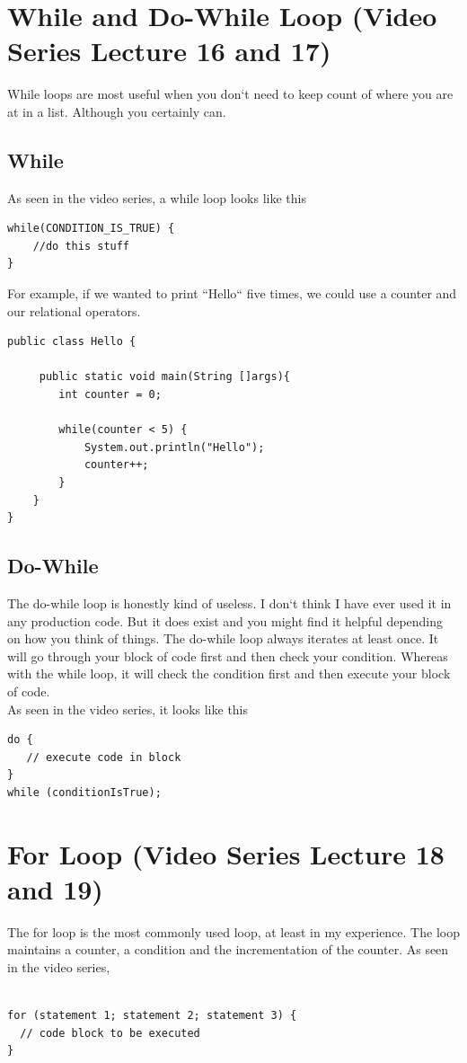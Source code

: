 \documentclass[11]{article}
\begin{document}
\section{While and Do-While Loop (Video Series Lecture 16 and 17)}
While loops are most useful when you don`t need to keep count of where you are at in a list. Although you certainly can.
\subsection{While}
As seen in the video series, a while loop looks like this
\begin{lstlisting}
while(CONDITION_IS_TRUE) {
	//do this stuff
}
\end{lstlisting}

For example, if we wanted to print ``Hello`` five times, we could use a  counter and our relational operators.
\begin{lstlisting}
public class Hello {

     public static void main(String []args){
        int counter = 0;
        
        while(counter < 5) {
            System.out.println("Hello");
            counter++;
        }
    }
}
\end{lstlisting}

\subsection{Do-While}
The do-while loop is honestly kind of useless. I don`t think I have ever used it in any production code. But it does exist and you might find it helpful depending on how you think of things. The do-while loop always iterates at least once. It will go through your block of code first and then check your condition. Whereas with the while loop, it will check the condition first and then execute your block of code.\\

As seen in the video series, it looks like this

\begin{lstlisting}
do {
   // execute code in block
}
while (conditionIsTrue);
\end{lstlisting}
\section{For Loop (Video Series Lecture 18 and 19)}
The for loop is the most commonly used loop, at least in my experience. The loop maintains a counter, a condition and the incrementation of the counter. As seen in the video series, 
\begin{lstlisting}

for (statement 1; statement 2; statement 3) {
  // code block to be executed
}
\end{lstlisting}
\end{document}
